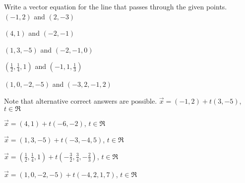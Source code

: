 

\begin{Exercise}[
name={},
title={}, 
difficulty=0,
origin={\cite{SM}}]
Write a vector equation for the line that passes through the given points.
\Question $(-1,2)$ and $(2,-3)$

\Question $(4,1)$ and $(-2,-1)$

\Question $(1,3,-5)$ and $(-2,-1,0)$

\Question $\left(\frac{1}{2},\frac{1}{4},1\right)$ and $\left(-1,1,\frac{1}{3}\right)$

\Question $(1,0,-2,-5)$ and $(-3,2,-1,2)$
\end{Exercise}

\begin{Answer}
Note that alternative correct answers are possible.
\Question $\vec{x} = (-1,2) + t(3,-5)$, $t\in\Re$

\Question $\vec{x} = (4,1) + t(-6,-2)$, $t\in\Re$

\Question $\vec{x} = (1,3,-5) + t(-3,-4,5)$, $t\in\Re$

\Question $\vec{x} = \left(\frac{1}{2},\frac{1}{4},1\right) + t\left(-\frac{3}{2},\frac{3}{4},-\frac{2}{3}\right)$, $t\in\Re$

\Question $\vec{x} = (1,0,-2,-5)+t(-4,2,1,7)$, $t\in\Re$
\end{Answer}
